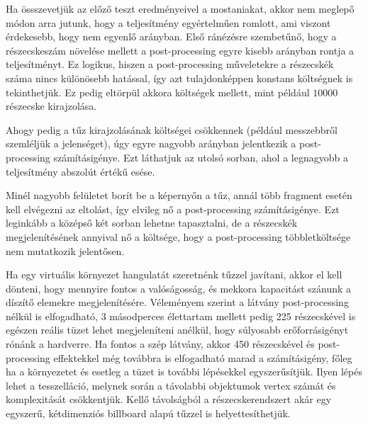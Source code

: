 Ha össszevetjük az előző teszt eredményeivel a mostaniakat, akkor nem meglepő módon arra jutunk, hogy a teljesítmény egyértelműen romlott, ami viszont érdekesebb, hogy nem egyenlő arányban. Első ránézésre szembetűnő, hogy a részecskeszám növelése mellett a post-processing egyre kisebb arányban rontja a teljesítményt. Ez logikus, hiszen a post-processing műveletekre a részecskék száma nincs különösebb hatással, így azt tulajdonképpen konstans költségnek is tekinthetjük. Ez pedig eltörpül akkora költségek mellett, mint például $10000$ részecske kirajzolása.

Ahogy pedig a tűz kirajzolásának költségei csökkennek (például messzebbről szemléljük a jelenséget), úgy egyre nagyobb arányban jelentkezik a post-processing számításigénye. Ezt láthatjuk az utolsó sorban, ahol a legnagyobb a teljesítmény abszolút értékű esése.

Minél nagyobb felületet borít be a képernyőn a tűz, annál több fragment esetén kell elvégezni az eltolást, így elvileg nő a post-processing számításigénye. Ezt leginkább a középső két sorban lehetne tapasztalni, de a részecskék megjelenítésének annyival nő a költsége, hogy a post-processing többletköltsége nem mutatkozik jelentősen.

Ha egy virtuális környezet hangulatát szeretnénk tűzzel javítani, akkor el kell dönteni, hogy mennyire fontos a valóságosság, és mekkora kapacitást szánunk a díszítő elemekre megjelenítésére. Véleményem szerint a látvány post-processing nélkül is elfogadható, 3 másodperces élettartam mellett pedig 225 részecskével is egészen reális tüzet lehet megjeleníteni anélkül, hogy súlyosabb erőforrásigényt rónánk a hardverre. Ha fontos a szép látvány, akkor 450 részecskével és post-processing effektekkel még továbbra is elfogadható marad a számításigény, főleg ha a környezetet és esetleg a tüzet is további lépésekkel egyszerűsítjük. Ilyen lépés lehet a tesszelláció, melynek során a távolabbi objektumok vertex számát és komplexitását csökkentjük. Kellő távolságból a részecskerendszert akár egy egyszerű, kétdimenziós billboard alapú tűzzel is helyettesíthetjük.








